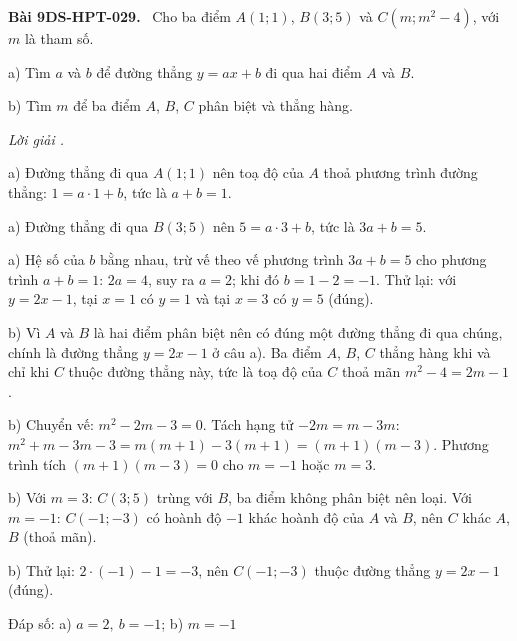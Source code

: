 \documentclass[12pt,a4paper]{article}
\newenvironment{problem}[1][]{\par\medskip\noindent\textbf{Bài #1.}\ }{\par}
\newenvironment{solution}[1][]{\par\noindent\textit{Lời giải #1.}\par}{\par}
\begin{document}
\begin{problem}[9DS-HPT-029]
Cho ba điểm $A(1; 1)$, $B(3; 5)$ và $C(m; m^2 - 4)$, với $m$ là tham số.

a) Tìm $a$ và $b$ để đường thẳng $y = ax + b$ đi qua hai điểm $A$ và $B$.

b) Tìm $m$ để ba điểm $A$, $B$, $C$ phân biệt và thẳng hàng.

\begin{solution}
a) Đường thẳng đi qua $A(1; 1)$ nên toạ độ của $A$ thoả phương trình đường thẳng: $1 = a \cdot 1 + b$, tức là $a + b = 1$.

a) Đường thẳng đi qua $B(3; 5)$ nên $5 = a \cdot 3 + b$, tức là $3a + b = 5$.

a) Hệ số của $b$ bằng nhau, trừ vế theo vế phương trình $3a + b = 5$ cho phương trình $a + b = 1$: $2a = 4$, suy ra $a = 2$; khi đó $b = 1 - 2 = -1$. Thử lại: với $y = 2x - 1$, tại $x = 1$ có $y = 1$ và tại $x = 3$ có $y = 5$ (đúng).

b) Vì $A$ và $B$ là hai điểm phân biệt nên có đúng một đường thẳng đi qua chúng, chính là đường thẳng $y = 2x - 1$ ở câu a). Ba điểm $A$, $B$, $C$ thẳng hàng khi và chỉ khi $C$ thuộc đường thẳng này, tức là toạ độ của $C$ thoả mãn $m^2 - 4 = 2m - 1$.

b) Chuyển vế: $m^2 - 2m - 3 = 0$. Tách hạng tử $-2m = m - 3m$: $m^2 + m - 3m - 3 = m(m + 1) - 3(m + 1) = (m + 1)(m - 3)$. Phương trình tích $(m + 1)(m - 3) = 0$ cho $m = -1$ hoặc $m = 3$.

b) Với $m = 3$: $C(3; 5)$ trùng với $B$, ba điểm không phân biệt nên loại. Với $m = -1$: $C(-1; -3)$ có hoành độ $-1$ khác hoành độ của $A$ và $B$, nên $C$ khác $A$, $B$ (thoả mãn).

b) Thử lại: $2 \cdot (-1) - 1 = -3$, nên $C(-1; -3)$ thuộc đường thẳng $y = 2x - 1$ (đúng).

Đáp số: a) $\boxed{a = 2,\ b = -1}$; b) $\boxed{m = -1}$
\end{solution}
\end{problem}
\end{document}
